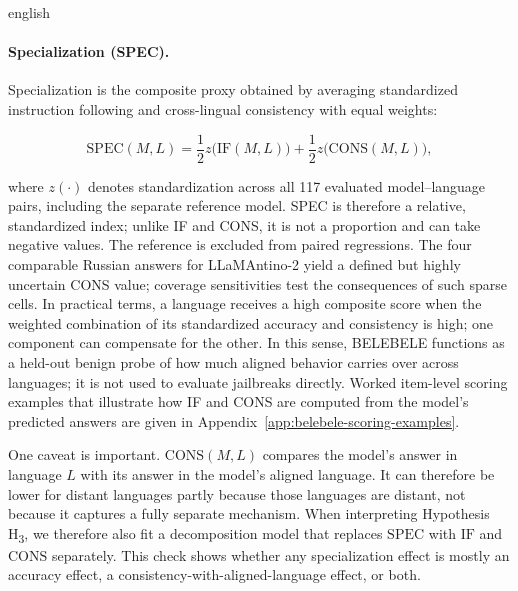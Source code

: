 \begin{otherlanguage*}{english}
\paragraph*{Specialization (SPEC).}
Specialization is the composite proxy obtained by averaging standardized instruction following and cross-lingual consistency with equal weights:


\begin{equation}
\mathrm{SPEC}(M,L) = \frac{1}{2} z\bigl(\mathrm{IF}(M,L)\bigr) + \frac{1}{2} z\bigl(\mathrm{CONS}(M,L)\bigr),
\label{eq:spec-score}
\end{equation}

where $z(\cdot)$ denotes standardization across all 117 evaluated model--language pairs, including the separate reference model. SPEC is therefore a relative, standardized index; unlike IF and CONS, it is not a proportion and can take negative values. The reference is excluded from paired regressions. The four comparable Russian answers for LLaMAntino-2 yield a defined but highly uncertain CONS value; coverage sensitivities test the consequences of such sparse cells. In practical terms, a language receives a high composite score when the weighted combination of its standardized accuracy and consistency is high; one component can compensate for the other. In this sense, BELEBELE functions as a held-out benign probe of how much aligned behavior carries over across languages; it is not used to evaluate jailbreaks directly. Worked item-level scoring examples that illustrate how IF and CONS are computed from the model's predicted answers are given in Appendix~\ref{app:belebele-scoring-examples}.

One caveat is important. $\mathrm{CONS}(M,L)$ compares the model's answer in language $L$ with its answer in the model's aligned language. It can therefore be lower for distant languages partly because those languages are distant, not because it captures a fully separate mechanism. When interpreting Hypothesis H\textsubscript{3}, we therefore also fit a decomposition model that replaces $\mathrm{SPEC}$ with $\mathrm{IF}$ and $\mathrm{CONS}$ separately. This check shows whether any specialization effect is mostly an accuracy effect, a consistency-with-aligned-language effect, or both.


\end{otherlanguage*}
